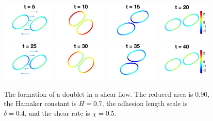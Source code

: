 \documentclass[prf,superscriptaddress,showpacs]{revtex4-1}
\begin{document}
\begin{figure}[htp]
  \includegraphics[width=0.24\textwidth]{figs/adR4em1adS7em1Chi5em1_ra090_image01.png}
  \includegraphics[width=0.24\textwidth]{figs/adR4em1adS7em1Chi5em1_ra090_image02.png}
  \includegraphics[width=0.24\textwidth]{figs/adR4em1adS7em1Chi5em1_ra090_image03.png}
  \includegraphics[width=0.24\textwidth]{figs/adR4em1adS7em1Chi5em1_ra090_image04.png}
  \includegraphics[width=0.24\textwidth]{figs/adR4em1adS7em1Chi5em1_ra090_image05.png}
  \includegraphics[width=0.24\textwidth]{figs/adR4em1adS7em1Chi5em1_ra090_image06.png}
  \includegraphics[width=0.24\textwidth]{figs/adR4em1adS7em1Chi5em1_ra090_image07.png}
  \includegraphics[width=0.24\textwidth]{figs/adR4em1adS7em1Chi5em1_ra090_image08.png}
  \caption{\label{fig:doublet090} The formation of a doublet in a shear
  flow.  The reduced area is $0.90$, the Hamaker constant is $H=0.7$,
  the adhesion length scale is $\delta = 0.4$, and the shear rate is
  $\chi=0.5$.}
\end{figure}
\end{document}
